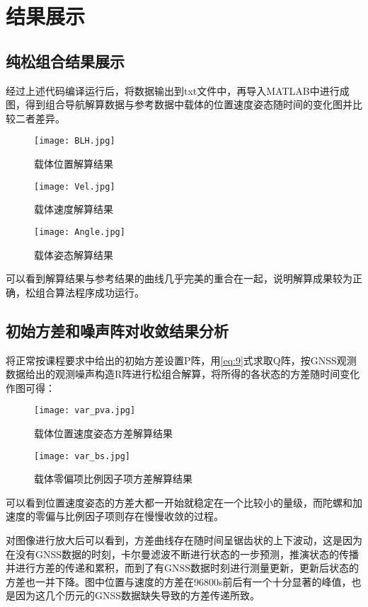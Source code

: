 \documentclass[codepkg=listings,theme=fancy]{course-report}
\begin{document}
\section{结果展示}
\subsection{纯松组合结果展示}

经过上述代码编译运行后，将数据输出到txt文件中，再导入MATLAB中进行成图，得到组合导航解算数据与参考数据中载体的位置速度姿态随时间的变化图并比较二者差异。

\begin{figure}[H]
\texttt{[image: BLH.jpg]}
\caption{载体位置解算结果}
\end{figure}

\begin{figure}[H]
\texttt{[image: Vel.jpg]}
\caption{载体速度解算结果}
\end{figure}

\begin{figure}[H]
\texttt{[image: Angle.jpg]}
\caption{载体姿态解算结果}
\end{figure}

可以看到解算结果与参考结果的曲线几乎完美的重合在一起，说明解算成果较为正确，松组合算法程序成功运行。


\subsection{初始方差和噪声阵对收敛结果分析}

将正常按课程要求中给出的初始方差设置P阵，用\eqref{eq:9}式求取Q阵，按GNSS观测数据给出的观测噪声构造R阵进行松组合解算，将所得的各状态的方差随时间变化作图可得：

\begin{figure}[H]
\texttt{[image: var\_pva.jpg]}
\caption{载体位置速度姿态方差解算结果}
\end{figure}

\begin{figure}[H]
\texttt{[image: var\_bs.jpg]}
\caption{载体零偏项比例因子项方差解算结果}
\end{figure}

可以看到位置速度姿态的方差大都一开始就稳定在一个比较小的量级，而陀螺和加速度的零偏与比例因子项则存在慢慢收敛的过程。

对图像进行放大后可以看到，方差曲线存在随时间呈锯齿状的上下波动，这是因为在没有GNSS数据的时刻，卡尔曼滤波不断进行状态的一步预测，推演状态的传播并进行方差的传递和累积，而到了有GNSS数据时刻进行测量更新，更新后状态的方差也一并下降。图中位置与速度的方差在96800s前后有一个十分显著的峰值，也是因为这几个历元的GNSS数据缺失导致的方差传递所致。
\end{document}
